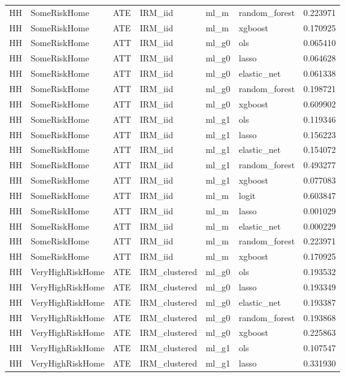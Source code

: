 \begin{longtable}{llllllr}
HH & SomeRiskHome & ATE & IRM\_iid & ml\_m & random\_forest & 0.223971 \\
HH & SomeRiskHome & ATE & IRM\_iid & ml\_m & xgboost & 0.170925 \\
HH & SomeRiskHome & ATT & IRM\_iid & ml\_g0 & ols & 0.065410 \\
HH & SomeRiskHome & ATT & IRM\_iid & ml\_g0 & lasso & 0.064628 \\
HH & SomeRiskHome & ATT & IRM\_iid & ml\_g0 & elastic\_net & 0.061338 \\
HH & SomeRiskHome & ATT & IRM\_iid & ml\_g0 & random\_forest & 0.198721 \\
HH & SomeRiskHome & ATT & IRM\_iid & ml\_g0 & xgboost & 0.609902 \\
HH & SomeRiskHome & ATT & IRM\_iid & ml\_g1 & ols & 0.119346 \\
HH & SomeRiskHome & ATT & IRM\_iid & ml\_g1 & lasso & 0.156223 \\
HH & SomeRiskHome & ATT & IRM\_iid & ml\_g1 & elastic\_net & 0.154072 \\
HH & SomeRiskHome & ATT & IRM\_iid & ml\_g1 & random\_forest & 0.493277 \\
HH & SomeRiskHome & ATT & IRM\_iid & ml\_g1 & xgboost & 0.077083 \\
HH & SomeRiskHome & ATT & IRM\_iid & ml\_m & logit & 0.603847 \\
HH & SomeRiskHome & ATT & IRM\_iid & ml\_m & lasso & 0.001029 \\
HH & SomeRiskHome & ATT & IRM\_iid & ml\_m & elastic\_net & 0.000229 \\
HH & SomeRiskHome & ATT & IRM\_iid & ml\_m & random\_forest & 0.223971 \\
HH & SomeRiskHome & ATT & IRM\_iid & ml\_m & xgboost & 0.170925 \\
HH & VeryHighRiskHome & ATE & IRM\_clustered & ml\_g0 & ols & 0.193532 \\
HH & VeryHighRiskHome & ATE & IRM\_clustered & ml\_g0 & lasso & 0.193349 \\
HH & VeryHighRiskHome & ATE & IRM\_clustered & ml\_g0 & elastic\_net & 0.193387 \\
HH & VeryHighRiskHome & ATE & IRM\_clustered & ml\_g0 & random\_forest & 0.193868 \\
HH & VeryHighRiskHome & ATE & IRM\_clustered & ml\_g0 & xgboost & 0.225863 \\
HH & VeryHighRiskHome & ATE & IRM\_clustered & ml\_g1 & ols & 0.107547 \\
HH & VeryHighRiskHome & ATE & IRM\_clustered & ml\_g1 & lasso & 0.331930 \\

\end{longtable}
